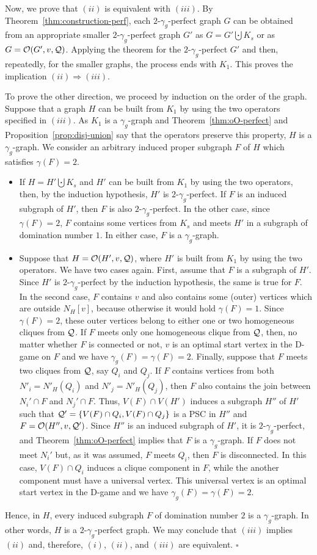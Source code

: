 \documentclass[12pt]{article}
\newcommand{\qed}{\hfill $\square$ \bigskip}
\newcommand{\cO}{{\cal O}}
\newcommand{\cQ}{{\cal Q}}
\begin{document}
Now, we prove that $(ii)$ is equivalent with $(iii)$. By Theorem~\ref{thm:construction-perf}, each $2$-$\gamma_g$-perfect graph $G$ can be obtained from an appropriate smaller $2$-$\gamma_g$-perfect graph $G'$ as $G=G' \bigcupdot K_s$ or as $G=\cO(G', v , \cQ)$. Applying the theorem for the $2$-$\gamma_g$-perfect $G'$ and then, repeatedly, for the smaller graphs, the process ends with $K_1$. This proves the  implication $(ii) \Rightarrow (iii)$. 

To prove the other direction, we proceed by induction on the order of the graph. Suppose that a graph $H$ can be built from $K_1$ by using the two operators specified in $(iii)$. As $K_1$ is a $\gamma_g$-graph and Theorem~\ref{thm:oO-perfect} and Proposition~\ref{prop:disj-union} say that the operators preserve this property, $H$ is a $\gamma_g$-graph. We consider an arbitrary induced proper subgraph $F$ of $H$ which satisfies $\gamma(F)=2$.
\begin{itemize}
\item If $H=H' \bigcupdot K_s$ and $H'$ can be built from $K_1$ by using the two operators, then, by the induction hypothesis, $H'$ is $2$-$\gamma_g$-perfect. If $F$ is an induced subgraph of $H'$,  then $F$ is also $2$-$\gamma_g$-perfect. In the other case, since $\gamma(F)=2$, $F$ contains some vertices from $K_s$ and meets $H'$ in a subgraph of domination number $1$. In either case, $F$ is a $\gamma_g$-graph.
\item Suppose that $H=\cO(H',v, \cQ)$, where $H'$ is built from $K_1$ by using the two operators.  We have two cases again. First, assume that $F$ is a subgraph of $H'$. Since $H'$ is $2$-$\gamma_g$-perfect by the induction hypothesis, the same is true for $F$. In the second case, $F$ contains $v$ and also contains some (outer) vertices which are outside $N_H[v]$, because otherwise it would hold $\gamma(F) = 1$. Since $\gamma(F)=2$, these outer vertices belong to either one or two homogeneous cliques from $\cQ$. If $F$ meets only one homogeneous clique from $\cQ$, then, no matter whether $F$ is connected or not, $v$ is an optimal start vertex in the D-game on $F$ and we have $\gamma_g(F)=\gamma(F)=2$. Finally, suppose that $F$ meets two cliques from $\cQ$, say $Q_i$ and $Q_j$. If $F$ contains vertices from both $N'_i=N'_H(Q_i)$ and $N'_j=N'_H(Q_j)$, then $F$ also contains the join between $N_i'\cap F$ and $N_j'\cap F$. Thus, $V(F)\cap V(H')$ induces a subgraph $H''$ of $H'$ such that $\cQ'=\{V(F) \cap Q_i, V(F) \cap Q_j\}$ is a PSC in $H''$ and  $F=\cO(H'', v, \cQ')$. Since $H''$ is an induced subgraph of $H'$, it is $2$-$\gamma_g$-perfect, and  Theorem~\ref{thm:oO-perfect}  implies that $F$ is a $\gamma_g$-graph. If $F$ does not meet $N_i'$ but, as it was assumed, $F$ meets $Q_i$, then $F$ is disconnected. In this case, $V(F) \cap Q_i$ induces a clique component in $F$, while the another component must have a universal vertex. This universal vertex is an optimal start vertex in the D-game and we have $\gamma_g(F)=\gamma(F)=2$.
\end{itemize}
Hence, in $H$, every induced subgraph $F$ of domination number $2$ is a $\gamma_g$-graph. In other words, $H$ is a $2$-$\gamma_g$-perfect graph. We may conclude that $(iii)$ implies $(ii)$ and, therefore, $(i)$, $(ii)$, and $(iii)$ are equivalent. \qed
\end{document}
